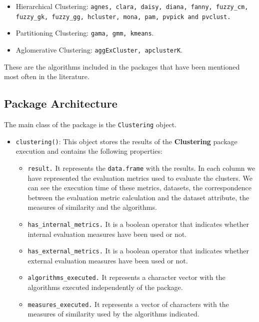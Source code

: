 \documentclass[
]{article}
\providecommand{\tightlist}{%
  \setlength{\itemsep}{0pt}\setlength{\parskip}{0pt}}
\begin{document}
\begin{itemize}
\tightlist
\item
  Hierarchical Clustering:
  \texttt{agnes, clara, daisy, diana, fanny, fuzzy\_cm, fuzzy\_gk, fuzzy\_gg, hcluster, mona, pam, pvpick and pvclust.}
\item
  Partitioning Clustering: \texttt{gama, gmm, kmeans}.
\item
  Aglomerative Clustering: \texttt{aggExCluster, apclusterK}.
\end{itemize}

These are the algorithms included in the packages that have been
mentioned most often in the literature.

\hypertarget{package-architecture}{%
\subsection{Package Architecture}\label{package-architecture}}

The main class of the package is the \texttt{Clustering} object.

\begin{itemize}
\tightlist
\item
  \texttt{clustering()}: This object stores the results of the
  \textbf{Clustering} package execution and contains the following
  properties:

  \begin{itemize}
  \tightlist
  \item
    \texttt{result.} It represents the \texttt{data.frame} with the
    results. In each column we have represented the evaluation metrics
    used to evaluate the clusters. We can see the execution time of
    these metrics, datasets, the correspondence between the evaluation
    metric calculation and the dataset attribute, the measures of
    similarity and the algorithms.
  \item
    \texttt{has\_internal\_metrics.} It is a boolean operator that
    indicates whether internal evaluation measures have been used or
    not.
  \item
    \texttt{has\_external\_metrics.} It is a boolean operator that
    indicates whether external evaluation measures have been used or
    not.
  \item
    \texttt{algorithms\_executed.} It represents a character vector with
    the algorithms executed independently of the package.
  \item
    \texttt{measures\_executed.} It represents a vector of characters
    with the measures of similarity used by the algorithms indicated.
  \end{itemize}
\end{itemize}
\end{document}
